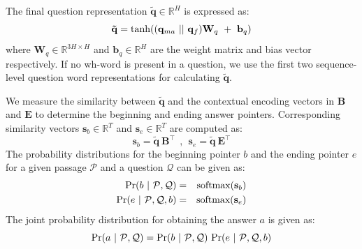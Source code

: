 \documentclass[letterpaper]{article} %
\begin{document}
The final question representation $\mathbf{\tilde{q}} \in \mathbb{R} ^{H}$ is expressed as:
\begin{equation}
\label{eq:q_tilde}
\mathbf{\tilde{q}} = \textnormal{tanh} ((\mathbf{q}_{ma} ~||~ \mathbf{q}_{f}) \mathbf{W}_q ~+~ \mathbf{b}_q )
\end{equation}
where $\mathbf{W}_q \in \mathbb{R} ^{3H \times H}$ and $\mathbf{b}_q \in \mathbb{R} ^{H}$ are the weight matrix and bias vector respectively. If no wh-word is present in a question, we use the first two sequence-level question word representations for calculating $\mathbf{\tilde{q}}$.

We measure the similarity between $\mathbf{\tilde{q}}$ and the contextual encoding vectors in $\mathbf{B}$ and $\mathbf{E}$ to determine the beginning and ending answer pointers. Corresponding similarity vectors $\mathbf{s}_b \in \mathbb{R} ^{T}$ and $\mathbf{s}_e \in \mathbb{R} ^{T}$ are computed as:
\begin{equation}
\mathbf{s}_b = \mathbf{\tilde{q}} ~ \mathbf{B}^\top  ~~,~~ \mathbf{s}_e = \mathbf{\tilde{q}} ~ \mathbf{E}^\top
\end{equation}
The probability distributions for the beginning pointer $b$ and the ending pointer $e$ for a given passage $\mathcal{P}$ and a question $\mathcal{Q}$ can be given as:
\begin{eqnarray}
\textnormal{Pr}(b ~|~ \mathcal{P},\mathcal{Q}) &=& \textnormal{softmax}(\mathbf{s}_b) \nonumber \\
\textnormal{Pr}(e ~|~ \mathcal{P},\mathcal{Q}, b) &=& \textnormal{softmax}(\mathbf{s}_e)
\end{eqnarray}
The joint probability distribution for obtaining the answer $a$ is given as:
\begin{equation}
\label{eq:joint_prob}
\textnormal{Pr}(a ~|~ \mathcal{P},\mathcal{Q}) = \textnormal{Pr}(b ~|~ \mathcal{P},\mathcal{Q}) ~ \textnormal{Pr}(e ~|~ \mathcal{P},\mathcal{Q}, b)
\end{equation}
\end{document}
